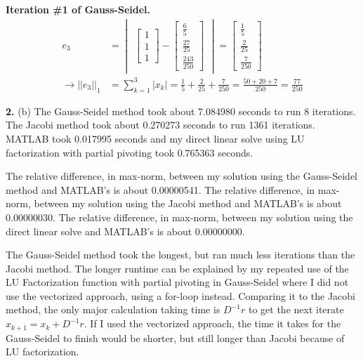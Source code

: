 \documentclass[12pt]{article}
\newcommand{\q}[1]{\textbf{#1}}
\begin{document}
\textbf{Iteration \#1 of Gauss-Seidel.}
\begin{align*}
    e_3 &= \begin{vmatrix}\begin{bmatrix} 1 \\[1.5ex] 1 \\[1.5ex] 1 \end{bmatrix} - 
    \begin{bmatrix}
        \frac{6}{5} \\[1.5ex]
        \frac{27}{25} \\[1.5ex]
        \frac{243}{250}
    \end{bmatrix} \end{vmatrix}
    = \begin{bmatrix}
        \frac{1}{5} \\[1.5ex]
        \frac{2}{25} \\[1.5ex]
        \frac{7}{250}
    \end{bmatrix} \\
    \longrightarrow ||e_3||_1 &= \sum_{k=1}^3 |x_k| = \frac{1}{5} + \frac{2}{25} + \frac{7}{250} = \frac{50+20+7}{250} = \frac{77}{250}
\end{align*}

\newpage
\q{2.} (b) The Gauss-Seidel method took about 7.084980 seconds to run 8 iterations. The Jacobi method took about 0.270273 seconds to run 1361 iterations. MATLAB took 0.017995 seconds and my direct linear solve using LU factorization with partial pivoting took 0.765363 seconds.

The relative difference, in max-norm, between my solution using the Gauss-Seidel method and MATLAB's is about 0.00000541. The relative difference, in max-norm, between my solution using the Jacobi method and MATLAB's is about 0.00000030. The relative difference, in max-norm, between my solution using the direct linear solve and MATLAB's is about 0.00000000.

The Gauss-Seidel method took the longest, but ran much less iterations than the Jacobi method. The longer runtime can be explained by my repeated use of the LU Factorization function with partial pivoting in Gauss-Seidel where I did not use the vectorized approach, using a for-loop instead. Comparing it to the Jacobi method, the only major calculation taking time is $D^{-1}r$ to get the next iterate $x_{k+1} = x_k + D^{-1}r$. If I used the vectorized approach, the time it takes for the Gauss-Seidel to finish would be shorter, but still longer than Jacobi because of LU factorization.
\end{document}
